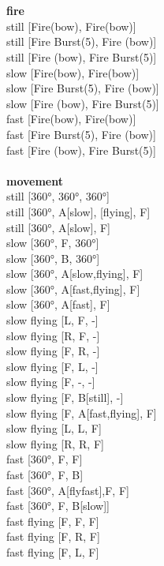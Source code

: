  
\ \\



\ \\ {\bf fire } \\
still [Fire(bow), Fire(bow)] \\
still [Fire Burst(5), Fire (bow)] \\
still [Fire (bow), Fire Burst(5)] \\
slow [Fire(bow), Fire(bow)] \\
slow [Fire Burst(5), Fire (bow)] \\
slow [Fire (bow), Fire Burst(5)] \\
fast [Fire(bow), Fire(bow)] \\
fast [Fire Burst(5), Fire (bow)] \\
fast [Fire (bow), Fire Burst(5)] \\
\ \\ {\bf movement } \\
still [360°, 360°, 360°] \\
still [360°, A[slow], [flying], F] \\
still [360°, A[slow], F] \\
slow [360°, F, 360°] \\
slow [360°, B, 360°] \\
slow [360°, A[slow,flying], F] \\
slow [360°, A[fast,flying], F] \\
slow [360°, A[fast], F] \\
slow flying [L, F, -] \\
slow flying [R, F, -] \\
slow flying [F, R, -] \\
slow flying [F, L, -] \\
slow flying [F, -, -] \\
slow flying [F, B[still], -] \\
slow flying [F, A[fast,flying], F] \\
slow flying [L, L, F] \\
slow flying [R, R, F] \\
fast [360°, F, F] \\
fast [360°, F, B] \\
fast [360°, A[flyfast],F, F] \\
fast [360°, F, B[slow]] \\
fast flying [F, F, F] \\
fast flying [F, R, F] \\
fast flying [F, L, F] \\
